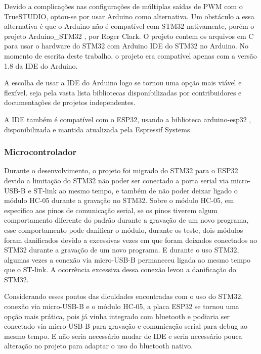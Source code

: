 Devido a complicações nas configurações de múltiplas saídas de PWM com o
TrueSTUDIO, optou-se por usar Arduino como alternativa. Um obstáculo a essa
alternativa é que o Arduino não é compatível com STM32 nativamente,
porém o projeto Arduino\_STM32 \cite{arduino_stm32}, por Roger Clark.
O projeto contem os arquivos em C para usar o hardware do STM32 com Arduino IDE
do STM32 no Arduino. No momento de escrita deste trabalho, o projeto era
compatível apenas com a versão 1.8 da IDE do Arduino.

A escolha de usar a IDE do Arduino logo se tornou uma opção mais viável e flexível.
seja pela vasta lista  bibliotecas disponibilizadas por contribuidores e
documentações de projetos independentes. 

A IDE também é compatível com o ESP32,  usando a biblioteca arduino-esp32 \cite{arduino_esp32},
disponibilizada e mantida atualizada pela Espressif Systems.

\subsubsection{Microcontrolador}

Durante o desenvolvimento, o projeto foi migrado do STM32 para o ESP32 
devido a limitação do STM32 não poder ser conectado a porta serial via micro-USB-B e ST-link ao mesmo tempo,
e também de não poder deixar ligado o módulo HC-05 durante a gravação no STM32.
Sobre o módulo HC-05, em específico aos pinos de comunicação serial, se os pinos tiverem algum comportamento
diferente do padrão durante a gravação de um novo programa, esse comportamento pode danificar o módulo,
durante os teste, dois módulos foram danificados devido a excessivas vezes em que foram deixados
conectados ao STM32 durante a gravação de um novo programa.
E durante o uso STM32, algumas vezes a conexão via micro-USB-B permaneceu ligada ao mesmo tempo que o ST-link. 
A ocorrência excessiva dessa conexão levou a danificação do STM32.

Considerando esses pontos das diculdades encontradas com o uso do STM32, conexão via micro-USB-B e o módulo HC-05,
a placa ESP32 se tornou uma opção mais prática, pois já vinha integrado com bluetooth e podiaria ser conectado via micro-USB-B
para gravação e comunicação serial para debug ao mesmo tempo. E não seria necessário mudar de IDE e
seria necessário pouca alteração no projeto para adaptar o uso do bluetooth nativo.